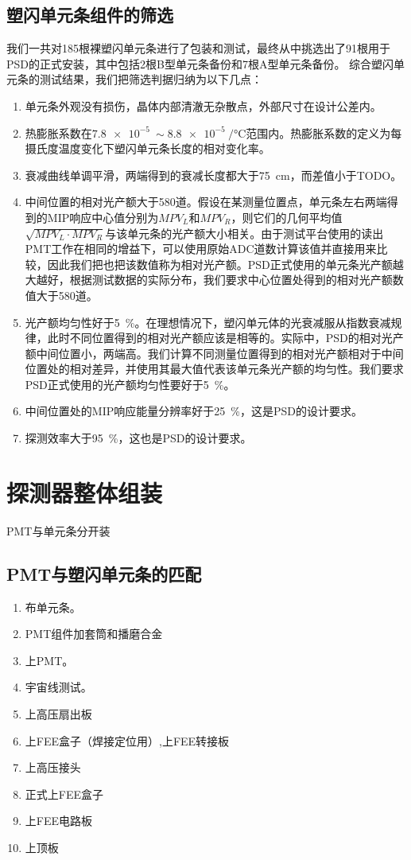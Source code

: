 \subsection{塑闪单元条组件的筛选}
\label{sec:construction:bar_selection}
我们一共对185根裸塑闪单元条进行了包装和测试，最终从中挑选出了91根用于PSD的正式安装，其中包括2根B型单元条备份和7根A型单元条备份。
综合塑闪单元条的测试结果，我们把筛选判据归纳为以下几点：
\begin{enumerate}
	\item 单元条外观没有损伤，晶体内部清澈无杂散点，外部尺寸在设计公差内。
	\item 热膨胀系数在$\SI{7.8e-5}{}\sim \SI{8.8e-5}{\per\celsius}$范围内。热膨胀系数的定义为每摄氏度温度变化下塑闪单元条长度的相对变化率。
	\item 衰减曲线单调平滑，两端得到的衰减长度都大于\SI{75}{cm}，而差值小于TODO。
	\item 中间位置的相对光产额大于580道。假设在某测量位置点，单元条左右两端得到的MIP响应中心值分别为$MPV_L$和$MPV_R$，则它们的几何平均值$\sqrt{MPV_L \cdot MPV_R}$与该单元条的光产额大小相关。由于测试平台使用的读出PMT工作在相同的增益下\cite{bar_test_2015}，可以使用原始ADC道数计算该值并直接用来比较，因此我们把也把该数值称为相对光产额。PSD正式使用的单元条光产额越大越好，根据测试数据的实际分布，我们要求中心位置处得到的相对光产额数值大于580道。
	\item 光产额均匀性好于\SI{5}{\percent}。在理想情况下，塑闪单元体的光衰减服从指数衰减规律，此时不同位置得到的相对光产额应该是相等的。实际中，PSD的相对光产额中间位置小，两端高。我们计算不同测量位置得到的相对光产额相对于中间位置处的相对差异，并使用其最大值代表该单元条光产额的均匀性。我们要求PSD正式使用的光产额均匀性要好于\SI{5}{\percent}。
	\item 中间位置处的MIP响应能量分辨率好于\SI{25}{\percent}，这是PSD的设计要求。
	\item 探测效率大于\SI{95}{\percent}，这也是PSD的设计要求。
\end{enumerate}

\section{探测器整体组装}
\label{sec:construction:psd_assembly}

PMT与单元条分开装
\subsection{PMT与塑闪单元条的匹配}

\begin{enumerate}
	\item 布单元条。
	\item PMT组件加套筒和播磨合金
	\item 上PMT。
	\item 宇宙线测试。
	\item 上高压扇出板
	\item 上FEE盒子（焊接定位用）,上FEE转接板
	\item 上高压接头
	\item 正式上FEE盒子
	\item 上FEE电路板
	\item 上顶板
\end{enumerate}

